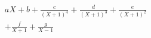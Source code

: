 \begin{multline*}
 aX+b+\frac{c}{(X+1)^4}+\frac{d}{(X+1)^3}+\frac{e}{(X+1)^2}\\+\frac{f}{X+1}+\frac{g}{X-1}
\end{multline*}
